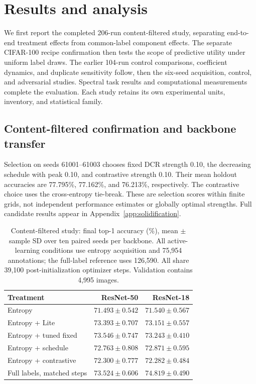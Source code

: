 \documentclass[10pt,a4paper,twocolumn]{article}
\begin{document}
\section{Results and analysis}\label{sec:results}

We first report the completed 206-run content-filtered study, separating
end-to-end treatment effects from common-label component effects.
The separate CIFAR-100 recipe confirmation then tests the scope of
predictive utility under uniform label draws. The earlier 104-run control comparisons, coefficient dynamics, and
duplicate sensitivity follow, then the six-seed acquisition, control,
and adversarial studies. Spectral task results and computational
measurements complete the evaluation. Each study retains its own
experimental units, inventory, and statistical family.

\subsection{Content-filtered confirmation and backbone transfer}
\label{sec:solidification_results}

Selection on seeds 61001--61003 chooses fixed DCR strength 0.10,
the decreasing schedule with peak 0.10, and contrastive strength 0.10.
Their mean holdout accuracies are 77.795\%, 77.162\%, and 76.213\%,
respectively. The contrastive choice uses the cross-entropy tie-break.
These are selection scores within finite grids, not independent
performance estimates or globally optimal strengths. Full candidate
results appear in Appendix~\ref{app:solidification}.

\begin{table}[tbp]
\caption{Content-filtered study: final top-1 accuracy (\%), mean
$\pm$ sample SD over ten paired seeds per backbone. All active-learning
conditions use entropy acquisition and 75,954 annotations; the full-label
reference uses 126,590. All share 39,100 post-initialization optimizer
steps. Validation contains 4,995 images.}
\label{tab:solid_endpoints}
\centering\footnotesize
\begin{tabular*}{\linewidth}{@{\extracolsep{\fill}}lrr@{}}
\toprule
Treatment & ResNet-50 & ResNet-18 \\
\midrule
Entropy & $71.493\pm0.542$ & $71.540\pm0.567$ \\
Entropy + Lite & $73.393\pm0.707$ & $73.151\pm0.557$ \\
Entropy + tuned fixed & $73.546\pm0.747$ & $73.243\pm0.410$ \\
Entropy + schedule & $72.763\pm0.808$ & $72.871\pm0.595$ \\
Entropy + contrastive & $72.300\pm0.777$ & $72.282\pm0.484$ \\
Full labels, matched steps & $73.524\pm0.606$ & $74.819\pm0.490$ \\
\bottomrule
\end{tabular*}
\end{table}
\end{document}
